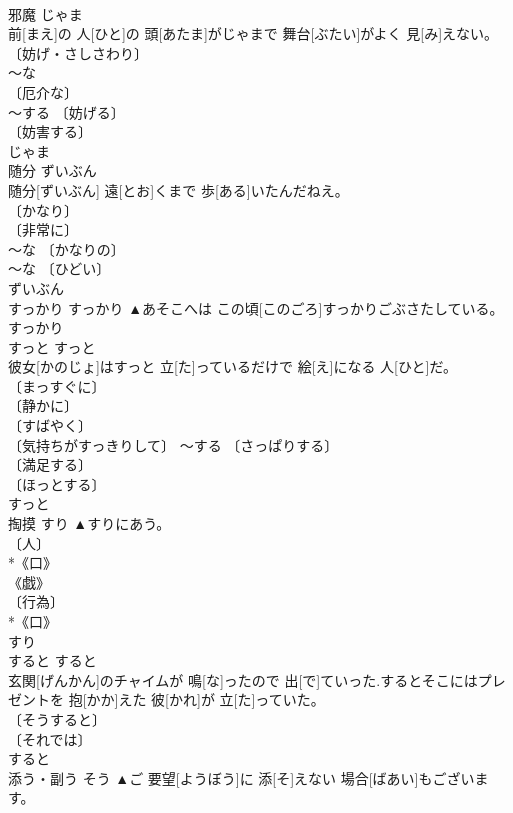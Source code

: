 \documentclass[8pt]{extreport}
\begin{document}
\begin{CJK}{UTF8}{min}
\\	邪魔	じゃま	
\\	前[まえ]の 人[ひと]の 頭[あたま]がじゃまで 舞台[ぶたい]がよく 見[み]えない。	
\\	〔妨げ・さしさわり〕 
\\	～な 
\\	〔厄介な〕 
\\	～する 〔妨げる〕 
\\	〔妨害する〕 
\\	じゃま	
\\	随分	ずいぶん	
\\	随分[ずいぶん] 遠[とお]くまで 歩[ある]いたんだねえ。	
\\	〔かなり〕 
\\	〔非常に〕 
\\	～な 〔かなりの〕 
\\	～な 〔ひどい〕 
\\	ずいぶん	
\\	すっかり	すっかり	▲あそこへは この頃[このごろ]すっかりごぶさたしている。	
\\	すっかり	
\\	すっと	すっと	
\\	彼女[かのじょ]はすっと 立[た]っているだけで 絵[え]になる 人[ひと]だ。	
\\	〔まっすぐに〕 
\\	〔静かに〕 
\\	〔すばやく〕 
\\	〔気持ちがすっきりして〕 ～する 〔さっぱりする〕 
\\	〔満足する〕 
\\	〔ほっとする〕 
\\	すっと	
\\	掏摸	すり	▲すりにあう。	
\\	〔人〕 
\\	*《口》 
\\	《戯》 
\\	〔行為〕 
\\	*《口》 
\\	すり	
\\	すると	すると	
\\	玄関[げんかん]のチャイムが 鳴[な]ったので 出[で]ていった.するとそこにはプレゼントを 抱[かか]えた 彼[かれ]が 立[た]っていた。	
\\	〔そうすると〕 
\\	〔それでは〕 
\\	[⇒それでは]		すると	
\\	添う・副う	そう	▲ご 要望[ようぼう]に 添[そ]えない 場合[ばあい]もございます。	

\end{CJK}
\end{document}
